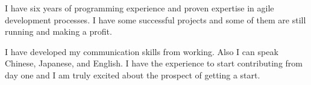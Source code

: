 \documentclass[11pt, a4paper]{awesome-cv}
\begin{document}
\begin{cvletter}
I have six years of programming experience and proven expertise in agile development processes. I have some successful projects and some of them are still running and making a profit.

I have developed my communication skills from working. Also I can speak Chinese, Japanese, and English. I have the experience to start contributing from day one and I am truly excited about the prospect of getting a start.


\end{cvletter}


\makeletterclosing
\end{document}
